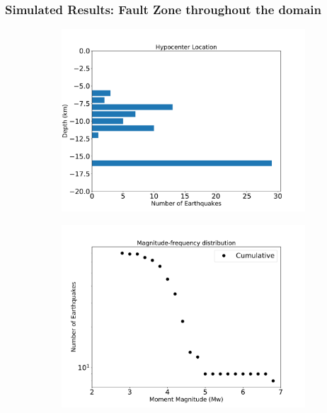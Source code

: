 \documentclass{beamer}
\begin{document}
\begin{frame}
    \frametitle{Simulated Results: Fault Zone throughout the domain }
    \begin{figure}
        \begin{subfigure}[b]{0.5\textwidth}
            \includegraphics[width=\textwidth]{images/longfz.pdf} 
        \end{subfigure}%
        \begin{subfigure}[b]{0.5\textwidth}
            \includegraphics[width=\textwidth]{images/longfz_mfd.pdf}
        \end{subfigure}%
    \end{figure}
\end{frame}
\end{document}
